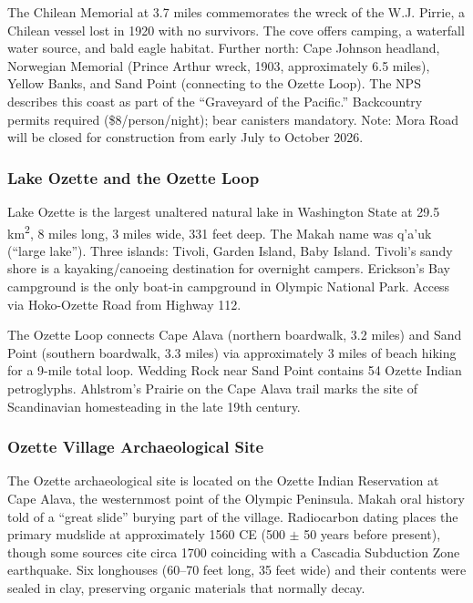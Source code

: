 \documentclass[11pt,letterpaper]{article}
\begin{document}
The Chilean Memorial at 3.7 miles commemorates the wreck of the W.J. Pirrie, a Chilean vessel lost in 1920 with no survivors. The cove offers camping, a waterfall water source, and bald eagle habitat. Further north: Cape Johnson headland, Norwegian Memorial (Prince Arthur wreck, 1903, approximately 6.5 miles), Yellow Banks, and Sand Point (connecting to the Ozette Loop). The NPS describes this coast as part of the ``Graveyard of the Pacific.'' Backcountry permits required (\$8/person/night); bear canisters mandatory. Note: Mora Road will be closed for construction from early July to October 2026.

\subsubsection{Lake Ozette and the Ozette Loop}
Lake Ozette is the largest unaltered natural lake in Washington State at 29.5 km\textsuperscript{2}, 8 miles long, 3 miles wide, 331 feet deep. The Makah name was q'a'uk (``large lake''). Three islands: Tivoli, Garden Island, Baby Island. Tivoli's sandy shore is a kayaking/canoeing destination for overnight campers. Erickson's Bay campground is the only boat-in campground in Olympic National Park. Access via Hoko-Ozette Road from Highway 112.

The Ozette Loop connects Cape Alava (northern boardwalk, 3.2 miles) and Sand Point (southern boardwalk, 3.3 miles) via approximately 3 miles of beach hiking for a 9-mile total loop. Wedding Rock near Sand Point contains 54 Ozette Indian petroglyphs. Ahlstrom's Prairie on the Cape Alava trail marks the site of Scandinavian homesteading in the late 19th century.

\subsubsection{Ozette Village Archaeological Site}
The Ozette archaeological site is located on the Ozette Indian Reservation at Cape Alava, the westernmost point of the Olympic Peninsula. Makah oral history told of a ``great slide'' burying part of the village. Radiocarbon dating places the primary mudslide at approximately 1560 CE (500 $\pm$ 50 years before present), though some sources cite circa 1700 coinciding with a Cascadia Subduction Zone earthquake. Six longhouses (60--70 feet long, 35 feet wide) and their contents were sealed in clay, preserving organic materials that normally decay.
\end{document}
